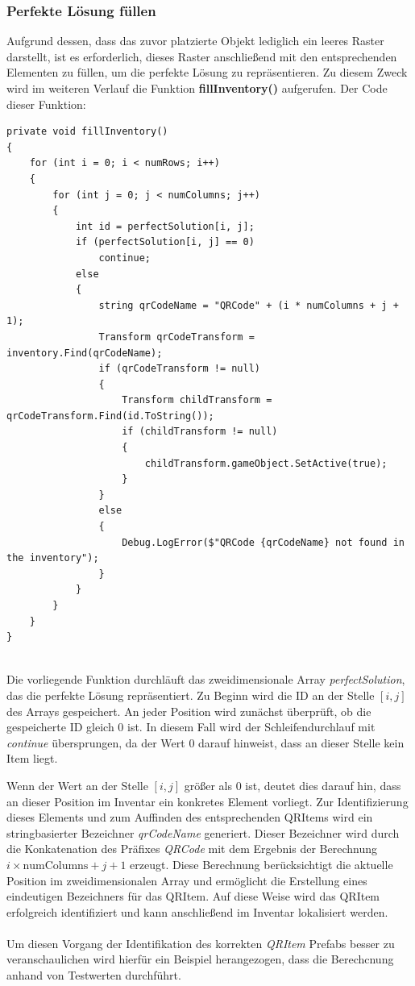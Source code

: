 \subsubsection{Perfekte Lösung füllen}
Aufgrund dessen, dass das zuvor platzierte Objekt lediglich ein leeres Raster darstellt, ist es erforderlich, dieses
Raster anschließend mit den entsprechenden Elementen zu füllen, um die perfekte Lösung zu repräsentieren. Zu diesem Zweck
wird im weiteren Verlauf die Funktion \textbf{fillInventory()} aufgerufen. Der Code dieser Funktion:
\begin{lstlisting}[style=csharp, caption={Inventar füllen}, label=code:invFül_PSV]
private void fillInventory()
{
    for (int i = 0; i < numRows; i++)
    {
        for (int j = 0; j < numColumns; j++)
        {
            int id = perfectSolution[i, j];
            if (perfectSolution[i, j] == 0)
                continue;
            else
            {
                string qrCodeName = "QRCode" + (i * numColumns + j + 1);
                Transform qrCodeTransform = inventory.Find(qrCodeName);
                if (qrCodeTransform != null)
                {
                    Transform childTransform = qrCodeTransform.Find(id.ToString());
                    if (childTransform != null)
                    {
                        childTransform.gameObject.SetActive(true);
                    }
                }
                else
                {
                    Debug.LogError($"QRCode {qrCodeName} not found in the inventory");
                }
            }
        }
    }
}
\end{lstlisting}\\
Die vorliegende Funktion durchläuft das zweidimensionale Array \textit{perfectSolution}, das die perfekte Lösung repräsentiert.
Zu Beginn wird die ID an der Stelle $[i, j]$ des Arrays gespeichert. An jeder Position wird zunächst überprüft, ob die
gespeicherte ID gleich 0 ist. In diesem Fall wird der Schleifendurchlauf mit \textit{continue} übersprungen, da der Wert
0 darauf hinweist, dass an dieser Stelle kein Item liegt.

Wenn der Wert an der Stelle $[i, j]$ größer als 0 ist, deutet dies darauf hin, dass an dieser Position im Inventar ein
konkretes Element vorliegt. Zur Identifizierung dieses Elements und zum Auffinden des entsprechenden QRItems wird ein
stringbasierter Bezeichner \textit{qrCodeName} generiert. Dieser Bezeichner wird durch die Konkatenation des Präfixes
\textit{QRCode} mit dem Ergebnis der Berechnung $i \times \text{numColumns} + j + 1$ erzeugt. Diese Berechnung berücksichtigt
die aktuelle Position im zweidimensionalen Array und ermöglicht die Erstellung eines eindeutigen Bezeichners für das QRItem.
Auf diese Weise wird das QRItem erfolgreich identifiziert und kann anschließend im Inventar lokalisiert werden.\\
\\
Um diesen Vorgang der Identifikation des korrekten \textit{QRItem} Prefabs besser zu veranschaulichen wird hierfür ein
Beispiel herangezogen, dass die Berechcnung anhand von Testwerten durchführt.

